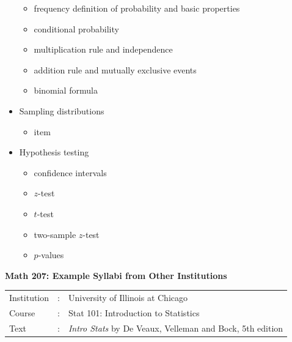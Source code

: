\documentclass[10pt]{article}
\begin{document}
\begin{itemize}
\begin{itemize}
  \item frequency definition of probability and basic properties
  \item conditional probability
  \item multiplication rule and independence
  \item addition rule and mutually exclusive events
  \item binomial formula
  \end{itemize}
\item Sampling distributions
  \begin{itemize}
  \item item
  \end{itemize}
\item Hypothesis testing
  \begin{itemize}
  \item confidence intervals
  \item $z$-test
  \item $t$-test
  \item two-sample $z$-test
  \item $p$-values
  \end{itemize}
\end{itemize}

\vfill
\eject


\begin{center}
  \textbf{\large Math 207: Example Syllabi from Other Institutions}
\bigskip\bigskip
\end{center}


\begin{tabular}{lcl}
Institution & : & University of Illinois at Chicago\\
Course      & : & Stat 101:  Introduction to Statistics\\
Text        & : & \textit{Intro Stats} by De Veaux, Velleman and Bock, 5th edition\\
\end{tabular}
\bigskip
\end{document}
